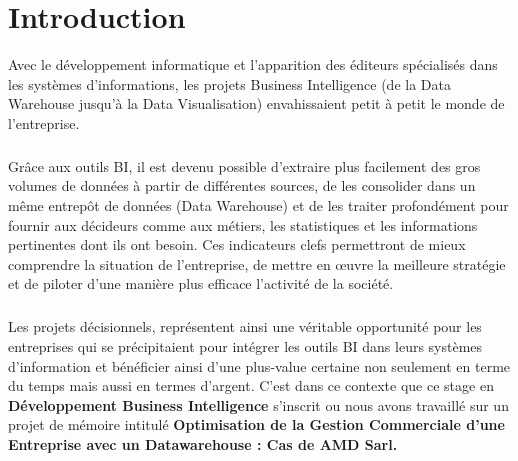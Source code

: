 \chapter*{Introduction}%
%
Avec le développement informatique et l’apparition des éditeurs spécialisés dans les systèmes d’informations, les projets Business Intelligence (de la Data Warehouse jusqu’à la Data Visualisation) envahissaient petit à petit le monde de l’entreprise.
\paragraph{}
Grâce aux outils BI, il est devenu possible d’extraire plus facilement des gros volumes de données à partir de différentes sources, de les consolider dans un même entrepôt de données (Data Warehouse) et de les traiter profondément pour fournir aux décideurs comme aux métiers, les statistiques et les informations pertinentes dont ils ont besoin. Ces indicateurs clefs permettront de mieux comprendre la situation de l’entreprise, de mettre en œuvre la meilleure stratégie et de piloter d’une manière plus efficace l’activité de la société.\paragraph{}
Les projets décisionnels, représentent ainsi une véritable opportunité pour les entreprises qui se précipitaient pour intégrer les outils BI dans leurs systèmes d’information et bénéficier ainsi d’une plus-value certaine non seulement en terme du temps mais aussi en termes d’argent. C'est dans ce contexte que ce stage en \textbf{Développement Business Intelligence} s'inscrit ou nous avons travaillé sur un projet de mémoire intitulé \textbf{Optimisation de la Gestion Commerciale d’une Entreprise avec un Datawarehouse : Cas de AMD Sarl.}